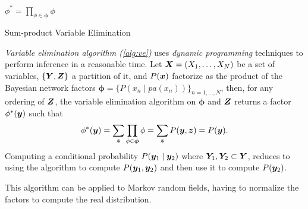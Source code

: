 \begin{algorithm}[t]
  \SetAlgoLined{}
  \(\phi^{*} = \prod_{\phi \in \bm{\phi}} \phi\)\;
  \KwRet{\(\phi^{*}\)}\;
  \caption{Sum-product Variable Elimination}\label{alg:ve}
\end{algorithm}

\emph{Variable elimination algorithm (\ref{alg:ve})} uses \emph{dynamic programming} techniques to perform inference in a reasonable time. Let \(\bm{X} = (X_{1},\dots,X_{N})\) be a set of variables, \(\{\bm{Y}, \bm{Z}\}\) a partition of it, and \(P(\bm{x})\) factorize as the product of the Bayesian network factors \(\bm{\phi} = \{P(x_{n}\mid pa(x_{n}))\}_{n = 1,\dots, N}\),  then, for any ordering of \(\bm{Z}\), the variable elimination algorithm on \(\bm{\phi}\) and \(\bm{Z}\) returns a factor \(\phi^{*}(\bm{y})\) such that
\[
  \phi^{*}(\bm{y}) = \sum_{\bm{z}} \prod_{\phi \in \bm{\phi}}\phi = \sum_{\bm{z}} P(\bm{y}, \bm{z}) = P(\bm{y}).
\]
Computing a conditional probability  \( P(\bm{y}_{1} \mid \bm{y}_{2})\) where \(\bm{Y}_{1}, \bm{Y}_{2} \subset \bm{Y}\), reduces to using the algorithm to compute \(P(\bm{y}_{1}, \bm{y}_{2})\) and then use it to compute \(P(\bm{y}_{2})\).

\begin{remark}
  This algorithm can be applied to Markov random fields, having to normalize the factors to compute the real distribution.
\end{remark}


